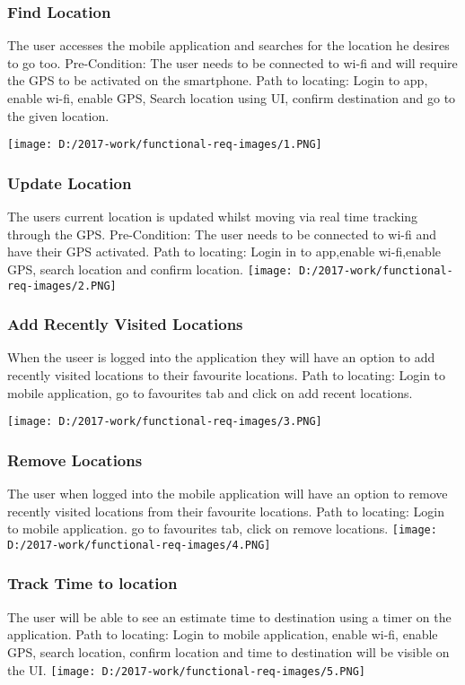 \documentclass{article}
\begin{document}
\subsubsection{Find Location}
The user accesses the mobile application and searches for the location he desires to go too. Pre-Condition: The user needs to be connected to wi-fi and will require the GPS to be activated on the smartphone. Path to locating: Login to app, enable wi-fi, enable GPS, Search location using UI, confirm destination and go to the given location.
\begin{center}
\texttt{[image: D:/2017-work/functional-req-images/1.PNG]}
\newpage
\subsubsection{Update Location}
The users current location is updated whilst moving via real time tracking through the GPS. Pre-Condition: The user needs to be connected to wi-fi and have their GPS activated. Path to locating: Login in to app,enable wi-fi,enable GPS, search location and confirm location.
\texttt{[image: D:/2017-work/functional-req-images/2.PNG]}
\newpage

\subsubsection{Add Recently Visited Locations}
When the useer is logged into the application they will have an option to add recently visited locations to their favourite locations. Path to locating: Login to mobile application, go to favourites tab and click on add recent locations.


\texttt{[image: D:/2017-work/functional-req-images/3.PNG]}
\newpage
\subsubsection{Remove Locations}
The user when logged into the mobile application will have an option to remove recently visited locations from their favourite locations. Path to locating: Login to mobile application. go to favourites tab, click on remove locations.
\texttt{[image: D:/2017-work/functional-req-images/4.PNG]}
\newpage
\subsubsection{Track Time to location}
The user will be able to see an estimate time to destination using a timer on the application. Path to locating: Login to mobile application, enable wi-fi, enable GPS, search location, confirm location and time to destination will be visible on the UI. 
\texttt{[image: D:/2017-work/functional-req-images/5.PNG]}
\newpage


\end{center}
\end{document}
